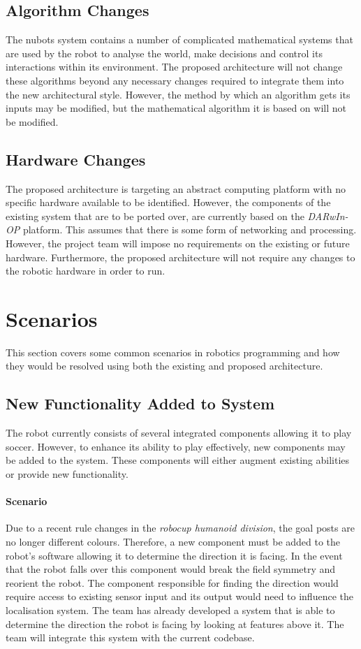 \documentclass[english,12pt]{scrartcl}
\begin{document}
		\subsection{Algorithm Changes}
			The \gls{nubots} system contains a number of complicated mathematical systems that are used by the robot to analyse the world, make decisions and control its interactions within its environment.
			The proposed architecture will not change these algorithms beyond any necessary changes required to integrate them into the new architectural style.
			However, the method by which an algorithm gets its inputs may be modified, but the mathematical algorithm it is based on will not be modified.

		\subsection{Hardware Changes}
			The proposed architecture is targeting an abstract computing platform with no specific hardware available to be identified.
			However, the components of the existing system that are to be ported over, are currently based on the \emph{DARwIn-OP} platform.
			This assumes that there is some form of networking and processing.
			However, the project team will impose no requirements on the existing or future hardware.
			Furthermore, the proposed architecture will not require any changes to the robotic hardware in order to run.

	\section{Scenarios}
		This section covers some common scenarios in robotics programming and how they would be resolved
		using both the existing and proposed architecture.

		\subsection{New Functionality Added to System}
			The robot currently consists of several integrated components allowing it to play soccer.
			However, to enhance its ability to play effectively, new components may be added to the system.
			These components will either augment existing abilities or provide new functionality.

			\paragraph{Scenario} Due to a recent rule changes in the
			\emph{\gls{robocup} humanoid division}, the goal posts are no longer different colours.
			Therefore, a new component must be added to the robot's software allowing it to determine the direction it is facing.
			In the event that the robot falls over this component would break the field symmetry and reorient the robot.
			The component responsible for finding the direction would require access to existing sensor input and its output would need to influence the localisation system.
			The team has already developed a system that is able to determine the direction the robot is facing by looking at features above it.
			The team will integrate this system with the current codebase.
\end{document}
